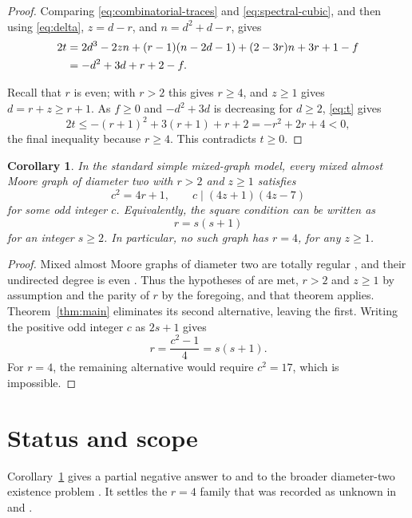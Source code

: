\documentclass[11pt]{amsart}
\newtheorem{corollary}[theorem]{Corollary}
\begin{document}
\begin{proof}
Comparing \eqref{eq:combinatorial-traces} and
\eqref{eq:spectral-cubic}, and then using \eqref{eq:delta},
$z=d-r$, and $n=d^2+d-r$, gives
\begin{align}
  2t
  &={}2d^3-2zn+(r-1)(n-2d-1)
       +(2-3r)n+3r+1-f
  \notag\\
  &=-d^2+3d+r+2-f.
  \label{eq:t}
\end{align}

Recall that $r$ is even; with $r>2$ this gives $r\geq 4$, and
$z\geq 1$ gives $d=r+z\geq r+1$. As $f\geq 0$ and $-d^2+3d$ is
decreasing for $d\geq 2$, \eqref{eq:t} gives
\[
  2t
  \leq -(r+1)^2+3(r+1)+r+2
  =-r^2+2r+4
  <0,
\]
the final inequality because $r\geq 4$. This contradicts $t\geq 0$.
\end{proof}

\begin{corollary}\label{cor:parameters}
In the standard simple mixed-graph model, every mixed almost Moore
graph of diameter two with $r>2$ and $z\geq 1$ satisfies
\[
  c^2=4r+1,
  \qquad
  c\mid(4z+1)(4z-7)
\]
for some odd integer $c$. Equivalently, the square condition can be
written as
\[
  r=s(s+1)
\]
for an integer $s\geq 2$. In particular, no such graph has $r=4$,
for any $z\geq 1$.
\end{corollary}

\begin{proof}
Mixed almost Moore graphs of diameter two are totally regular
\cite[Theorem~2.8]{TE}, and their undirected degree is even
\cite[Proposition~1]{LM}. Thus the hypotheses of
\cite[Theorem~2]{LM} are met, $r>2$ and $z\geq 1$ by assumption and
the parity of $r$ by the foregoing, and that theorem applies.
Theorem~\ref{thm:main} eliminates its second alternative, leaving the
first. Writing the positive odd integer $c$ as $2s+1$ gives
\[
  r=\frac{c^2-1}{4}=s(s+1).
\]
For $r=4$, the remaining alternative would require $c^2=17$, which
is impossible.
\end{proof}

\section{Status and scope}\label{sec:scope}

Corollary~\ref{cor:parameters} gives a partial negative answer to
\cite[Question~3]{LM} and to the broader diameter-two existence
problem \cite[Problem~5.2]{Shallcross}. It settles the $r=4$ family
that was recorded as unknown in \cite[Table~1]{LM} and
\cite[Table~1]{DFL}.
\end{document}
